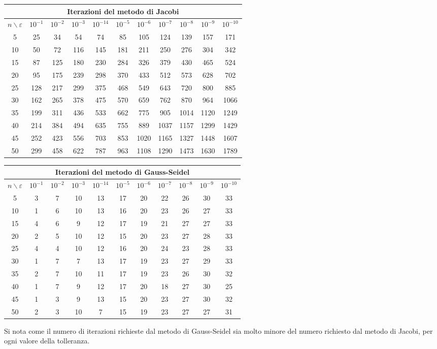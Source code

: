     \begin{center}\begin{tabular}{|c||c|c|c|c|c|c|c|c|c|c|}
    \hline\multicolumn{11}{c}{Iterazioni del metodo di Jacobi}\\\hline
    $n \backslash \varepsilon $ & $10^{-1}$& $10^{-2}$& $10^{-3}$& $10^{-14}$& $10^{-5}$& $10^{-6}$& $10^{-7}$& $10^{-8}$& $10^{-9}$& $10^{-10}$\\\hline
    5& 25 & 34 & 54 & 74 & 85 & 105 & 124 & 139 & 157 & 171 \\\hline
    10& 50 & 72 & 116 & 145 & 181 & 211 & 250 & 276 & 304 & 342 \\\hline
    15& 87 & 125 & 180 & 230 & 284 & 326 & 379 & 430 & 465 & 524 \\ \hline
    20& 95 & 175 & 239 & 298 & 370 & 433 & 512 & 573 & 628 & 702 \\\hline
    25& 128 & 217 & 299 & 375 & 468 & 549 & 643 & 720 & 800 & 885 \\ \hline
    30& 162 & 265 & 378 & 475 & 570 & 659 & 762 & 870 & 964 & 1066 \\ \hline
    35& 199 & 311 & 436 & 533 & 662 & 775 & 905 & 1014 & 1120 & 1249 \\ \hline
    40& 214 & 384 & 494 & 635 & 755 & 889 & 1037 & 1157 & 1299 & 1429 \\ \hline
    45& 252 & 423 & 556 & 703 & 853 & 1020 & 1165 & 1327 & 1448 & 1607 \\ \hline
    50& 299 & 458 & 622 & 787 & 963 & 1108 & 1290 & 1473 & 1630 & 1789 \\\hline
    \end{tabular}\end{center}
    \begin{center}\begin{tabular}{|c||c|c|c|c|c|c|c|c|c|c|}
    \hline\multicolumn{11}{c}{Iterazioni del metodo di Gauss-Seidel}\\\hline
    $n \backslash \varepsilon $ & $10^{-1}$& $10^{-2}$& $10^{-3}$& $10^{-14}$& $10^{-5}$& $10^{-6}$& $10^{-7}$& $10^{-8}$& $10^{-9}$& $10^{-10}$\\\hline
    5 & 3 & 7 & 10 & 13 & 17 & 20 & 22 & 26 & 30 & 33 \\\hline
    10 & 1 & 6 & 10 & 13 & 16 & 20 & 23 & 26 & 27 & 33 \\\hline
    15 & 4 & 6 & 9 & 12 & 17 & 19 & 21 & 27 & 27 & 33 \\ \hline
    20 & 2 & 5 & 10 & 12 & 15 & 20 & 23 & 27 & 28 & 33 \\ \hline
    25 & 4 & 4 & 10 & 12 & 16 & 20 & 24 & 23 & 28 & 33 \\ \hline
    30 & 1 & 7 & 7 & 13 & 17 & 19 & 23 & 27 & 29 & 33 \\ \hline
    35 & 2 & 7 & 10 & 11 & 17 & 19 & 23 & 26 & 30 & 32 \\ \hline
    40 & 1 & 7 & 9 & 12 & 17 & 20 & 18 & 27 & 30 & 25 \\ \hline
    45 & 1 & 3 & 9 & 13 & 15 & 20 & 23 & 27 & 30 & 32 \\ \hline
    50 & 2 & 3 & 10 & 7 & 15 & 19 & 23 & 27 & 27 & 31 \\ \hline
    \end{tabular}\end{center}

    Si nota come il numero di iterazioni richieste dal metodo di Gauss-Seidel sia molto minore del numero richiesto dal metodo di Jacobi, per ogni valore della tolleranza.
